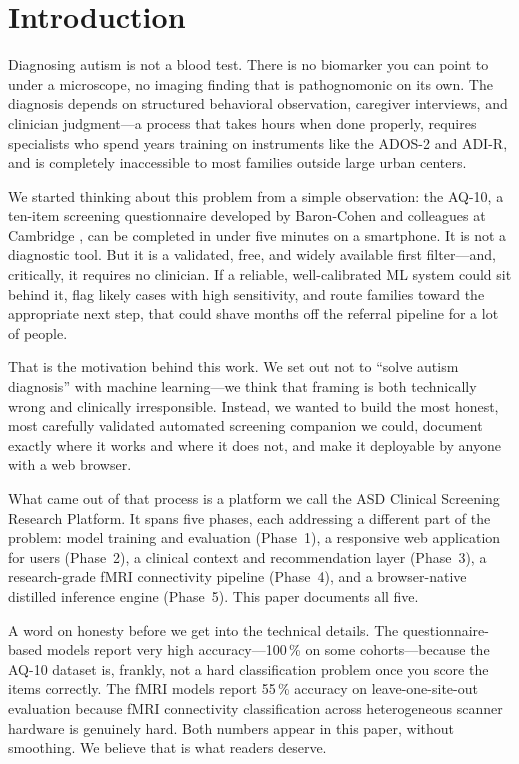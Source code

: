 \documentclass[conference]{IEEEtran}
\begin{document}
\section{Introduction}

Diagnosing autism is not a blood test. There is no biomarker you can
point to under a microscope, no imaging finding that is pathognomonic
on its own. The diagnosis depends on structured behavioral observation,
caregiver interviews, and clinician judgment---a process that takes
hours when done properly, requires specialists who spend years training
on instruments like the ADOS-2 \cite{lord2018ados} and ADI-R, and is completely inaccessible
to most families outside large urban centers.

We started thinking about this problem from a simple observation: the
AQ-10, a ten-item screening questionnaire developed by Baron-Cohen and
colleagues at Cambridge \cite{allison2012}, can be completed in under
five minutes on a smartphone. It is not a diagnostic tool. But it is a
validated, free, and widely available first filter---and, critically, it
requires no clinician. If a reliable, well-calibrated ML system could
sit behind it, flag likely cases with high sensitivity, and route
families toward the appropriate next step, that could shave months off
the referral pipeline for a lot of people.

That is the motivation behind this work. We set out not to
``solve autism diagnosis'' with machine learning---we think that framing
is both technically wrong and clinically irresponsible. Instead, we
wanted to build the most honest, most carefully validated automated
screening companion we could, document exactly where it works and where
it does not, and make it deployable by anyone with a web browser.

What came out of that process is a platform we call the ASD Clinical
Screening Research Platform. It spans five phases, each addressing a
different part of the problem: model training and evaluation (Phase~1),
a responsive web application for users (Phase~2), a clinical context
and recommendation layer (Phase~3), a research-grade fMRI connectivity
pipeline (Phase~4), and a browser-native distilled inference engine
(Phase~5). This paper documents all five.

A word on honesty before we get into the technical details. The
questionnaire-based models report very high accuracy---100\,\% on some
cohorts---because the AQ-10 dataset is, frankly, not a hard
classification problem once you score the items correctly. The fMRI
models report 55\,\% accuracy on leave-one-site-out evaluation because
fMRI connectivity classification across heterogeneous scanner hardware
is genuinely hard. Both numbers appear in this paper, without
smoothing. We believe that is what readers deserve.
\end{document}

